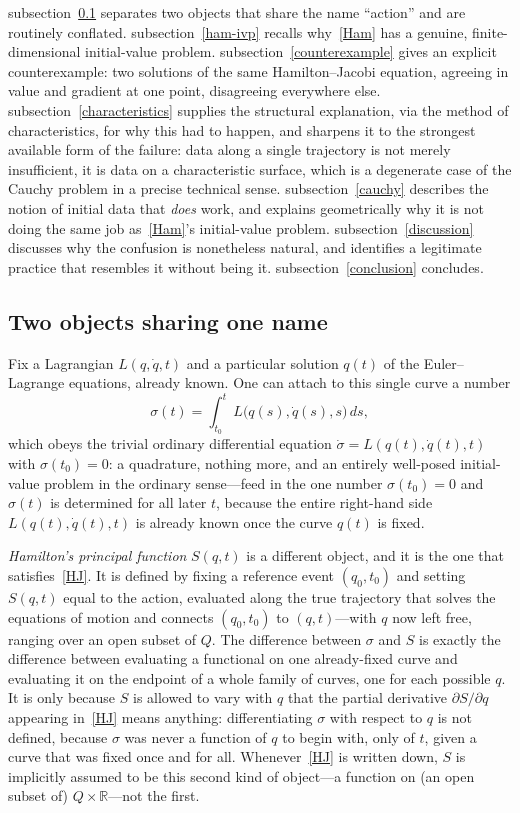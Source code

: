 subsection~\ref{two-objects} separates two objects that share the name
``action'' and are routinely conflated. subsection~\ref{ham-ivp} recalls
why~\eqref{Ham} has a genuine, finite-dimensional initial-value problem.
subsection~\ref{counterexample} gives an explicit counterexample: two solutions
of the same Hamilton--Jacobi equation, agreeing in value and gradient at one
point, disagreeing everywhere else. subsection~\ref{characteristics} supplies
the structural explanation, via the method of characteristics, for why this had
to happen, and sharpens it to the strongest available form of the failure: data
along a single trajectory is not merely insufficient, it is data on a
characteristic surface, which is a degenerate case of the Cauchy problem in a
precise technical sense. subsection~\ref{cauchy} describes the notion of
initial data that \emph{does} work, and explains geometrically why it is not
doing the same job as~\eqref{Ham}'s initial-value problem.
subsection~\ref{discussion} discusses why the confusion is nonetheless natural,
and identifies a legitimate practice that resembles it without being it.
subsection~\ref{conclusion} concludes.

\subsection{Two objects sharing one name}
\label{two-objects}

Fix a Lagrangian $L(q,\dot q,t)$ and a particular solution $q(t)$ of the
Euler--Lagrange equations, already known. One can attach to this single curve a
number
\begin{equation}
\sigma(t) = \int_{t_0}^t L\big(q(s),\dot q(s),s\big)\, ds ,
\end{equation}
which obeys the trivial ordinary differential equation $\dot\sigma =
L(q(t),\dot q(t),t)$ with $\sigma(t_0)=0$: a quadrature, nothing more, and an
entirely well-posed initial-value problem in the ordinary sense---feed in the
one number $\sigma(t_0)=0$ and $\sigma(t)$ is determined for all later $t$,
because the entire right-hand side $L(q(t),\dot q(t),t)$ is already known once
the curve $q(t)$ is fixed.

\emph{Hamilton's principal function} $S(q,t)$ is a different object, and it is
the one that satisfies~\eqref{HJ}. It is defined by fixing a reference event
$(q_0,t_0)$ and setting $S(q,t)$ equal to the action, evaluated along the true
trajectory that solves the equations of motion and connects $(q_0,t_0)$ to
$(q,t)$---with $q$ now left free, ranging over an open subset of $Q$. The
difference between $\sigma$ and $S$ is exactly the difference between
evaluating a functional on one already-fixed curve and evaluating it on the
endpoint of a whole family of curves, one for each possible $q$. It is only
because $S$ is allowed to vary with $q$ that the partial derivative $\partial
S/\partial q$ appearing in~\eqref{HJ} means anything: differentiating $\sigma$
with respect to $q$ is not defined, because $\sigma$ was never a function of
$q$ to begin with, only of $t$, given a curve that was fixed once and for all.
Whenever~\eqref{HJ} is written down, $S$ is implicitly assumed to be this
second kind of object---a function on (an open subset of)
$Q\times\mathbb{R}$---not the first.

